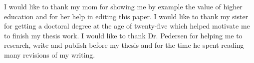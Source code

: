 \begin{thesisacknowledgments}
I would like to thank my mom for showing me by example the value of higher education and for her help in editing this paper. 
I would like to thank my sister for getting a doctoral degree at the age of twenty-five which helped motivate me to finish my thesis work.
I would like to thank Dr. Pedersen for helping me to research, write and publish before my thesis and for the time he spent reading many revisions of my writing.
\end{thesisacknowledgments}